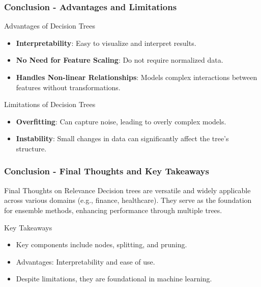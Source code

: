 \documentclass[aspectratio=169]{beamer}
\begin{document}
\begin{frame}[fragile]
    \frametitle{Conclusion - Advantages and Limitations}
    
    \begin{block}{Advantages of Decision Trees}
        \begin{itemize}
            \item \textbf{Interpretability}: Easy to visualize and interpret results.
            \item \textbf{No Need for Feature Scaling}: Do not require normalized data.
            \item \textbf{Handles Non-linear Relationships}: Models complex interactions between features without transformations.
        \end{itemize}
    \end{block}
    
    \begin{block}{Limitations of Decision Trees}
        \begin{itemize}
            \item \textbf{Overfitting}: Can capture noise, leading to overly complex models.
            \item \textbf{Instability}: Small changes in data can significantly affect the tree's structure.
        \end{itemize}
    \end{block}
\end{frame}

\begin{frame}[fragile]
    \frametitle{Conclusion - Final Thoughts and Key Takeaways}

    \begin{block}{Final Thoughts on Relevance}
        Decision trees are versatile and widely applicable across various domains (e.g., finance, healthcare). They serve as the foundation for ensemble methods, enhancing performance through multiple trees.
    \end{block}
    
    \begin{block}{Key Takeaways}
        \begin{itemize}
            \item Key components include nodes, splitting, and pruning.
            \item Advantages: Interpretability and ease of use.
            \item Despite limitations, they are foundational in machine learning.
        \end{itemize}
    \end{block}
\end{frame}
\end{document}
